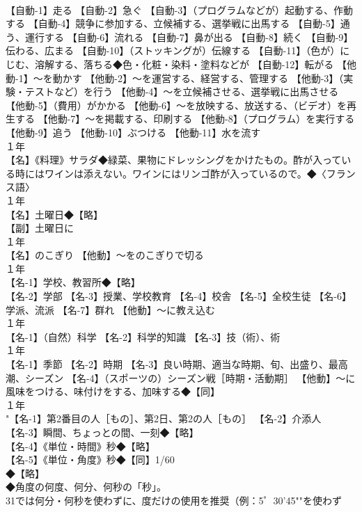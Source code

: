 \documentclass[8pt]{extreport}
\begin{document}
\begin{CJK}{UTF8}{min}
\\	【自動-1】走る 【自動-2】急ぐ 【自動-3】（プログラムなどが）起動する、作動する 【自動-4】競争に参加する、立候補する、選挙戦に出馬する 【自動-5】通う、運行する 【自動-6】流れる 【自動-7】鼻が出る 【自動-8】続く 【自動-9】伝わる、広まる 【自動-10】（ストッキングが）伝線する 【自動-11】（色が）にじむ、溶解する、落ちる◆色・化粧・染料・塗料などが 【自動-12】転がる 【他動-1】～を動かす 【他動-2】～を運営する、経営する、管理する 【他動-3】（実験・テストなど）を行う 【他動-4】～を立候補させる、選挙戦に出馬させる 【他動-5】（費用）がかかる 【他動-6】～を放映する、放送する、（ビデオ）を再生する 【他動-7】～を掲載する、印刷する 【他動-8】（プログラム）を実行する 【他動-9】追う 【他動-10】ぶつける 【他動-11】水を流す
\\	１年	
\\	【名】《料理》サラダ◆緑菜、果物にドレッシングをかけたもの。酢が入っている時にはワインは添えない。ワインにはリンゴ酢が入っているので。◆〈フランス語〉
\\	１年	
\\	【名】土曜日◆【略】
\\	【副】土曜日に
\\	１年	
\\	【名】のこぎり 【他動】～をのこぎりで切る
\\	１年	
\\	【名-1】学校、教習所◆【略】
\\	【名-2】学部 【名-3】授業、学校教育 【名-4】校舎 【名-5】全校生徒 【名-6】学派、流派 【名-7】群れ 【他動】～に教え込む
\\	１年	
\\	【名-1】（自然）科学 【名-2】科学的知識 【名-3】技（術）、術
\\	１年	
\\	【名-1】季節 【名-2】時期 【名-3】良い時期、適当な時期、旬、出盛り、最高潮、シーズン 【名-4】（スポーツの）シーズン戦［時期・活動期］ 【他動】～に風味をつける、味付けをする、加味する◆【同】
\\	１年	
\\	"【名-1】第2番目の人［もの］、第2日、第2の人［もの］ 【名-2】介添人 【名-3】瞬間、ちょっとの間、一刻◆【略】
\\	【名-4】《単位・時間》秒◆【略】
\\	【名-5】《単位・角度》秒◆【同】1/60 
\\	◆【略】
\\	◆角度の何度、何分、何秒の「秒」。
\\	31では何分・何秒を使わずに、度だけの使用を推奨（例：5゜30'45""を使わず 

\end{CJK}
\end{document}
